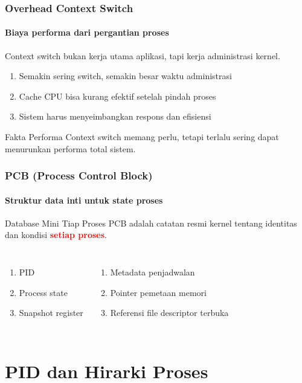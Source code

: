 \documentclass[t,aspectratio=169,xcolor=dvipsnames]{beamer}
\newcommand{\tem}[1]{\textbf{\textcolor{red}{#1}}}
\begin{document}
\begin{frame}
    \frametitle{Overhead Context Switch}
    \framesubtitle{Biaya performa dari pergantian proses}
    \small
    Context switch bukan kerja utama aplikasi, tapi kerja administrasi kernel.
    \begin{enumerate}
        \item Semakin sering switch, semakin besar waktu administrasi
        \item Cache CPU bisa kurang efektif setelah pindah proses
        \item Sistem harus menyeimbangkan respons dan efisiensi
    \end{enumerate}
    \begin{exampleblock}{Fakta Performa}
        Context switch memang perlu, tetapi terlalu sering dapat menurunkan performa total sistem.
    \end{exampleblock}
\end{frame}

\begin{frame}
    \frametitle{PCB (Process Control Block)}
    \framesubtitle{Struktur data inti untuk state proses}
    \begin{alertblock}{Database Mini Tiap Proses}
        PCB adalah catatan resmi kernel tentang identitas dan kondisi \tem{setiap proses}.
    \end{alertblock}
    \vspace{0.1cm}
    \small
    \begin{columns}[T]
        \begin{enumerate}
            \item PID
            \item Process state
            \item Snapshot register
        \end{enumerate}
        \begin{enumerate}
            \item Metadata penjadwalan
            \item Pointer pemetaan memori
            \item Referensi file descriptor terbuka
        \end{enumerate}
    \end{columns}
\end{frame}

\section{PID dan Hirarki Proses}
\end{document}
